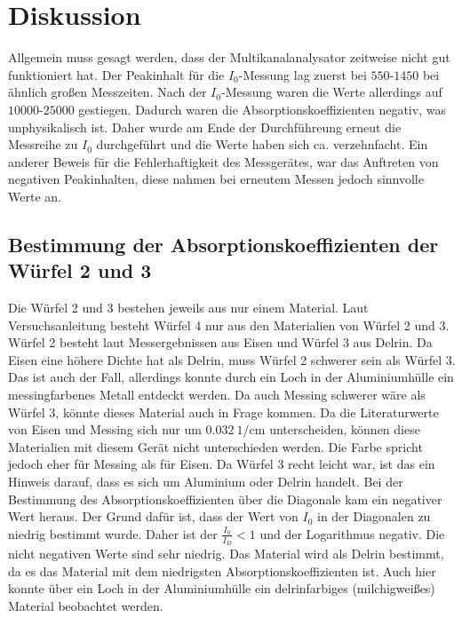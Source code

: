 \section{Diskussion}
\label{sec:Diskussion}

Allgemein muss gesagt werden, dass der Multikanalanalysator zeitweise nicht gut funktioniert hat. 
Der Peakinhalt für die $I_0$-Messung lag zuerst bei $\num{550}$-$\num{1450}$ bei ähnlich großen Messzeiten. Nach der $I_0$-Messung 
waren die Werte allerdings auf $\num{10000}$-$\num{25000}$ gestiegen. Dadurch waren die Absorptionskoeffizienten negativ, was unphysikalisch ist.
Daher wurde am Ende der Durchführeung erneut die Messreihe zu $I_0$ durchgeführt und die Werte haben sich ca. verzehnfacht. Ein anderer Beweis für 
die Fehlerhaftigkeit des Messgerätes, war das Auftreten von negativen Peakinhalten, diese nahmen bei erneutem Messen jedoch 
sinnvolle Werte an.

\subsection{Bestimmung der Absorptionskoeffizienten der Würfel 2 und 3}

Die Würfel 2 und 3 bestehen jeweils aus nur einem Material. Laut Versuchsanleitung besteht Würfel 4 nur aus den 
Materialien von Würfel 2 und 3. Würfel 2 besteht laut Messergebnissen aus Eisen und Würfel 3 aus Delrin. Da Eisen eine 
höhere Dichte hat als Delrin, muss Würfel 2 schwerer sein als Würfel 3. Das ist auch der Fall, allerdings konnte durch 
ein Loch in der Aluminiumhülle ein messingfarbenes Metall entdeckt werden. Da auch Messing schwerer wäre als Würfel 
3, könnte dieses Material auch in Frage kommen. Da die Literaturwerte von Eisen und Messing sich nur um $\SI{0.032}{1\per\centi\meter}$
unterscheiden, können diese Materialien mit diesem Gerät nicht unterschieden werden. Die Farbe spricht jedoch eher für Messing als für Eisen.
Da Würfel 3 recht leicht war, ist das ein Hinweis darauf, dass es sich um Aluminium oder Delrin handelt. 
Bei der Bestimmung des Absorptionskoeffizienten über die Diagonale kam ein negativer Wert heraus. Der Grund 
dafür ist, dass der Wert von $I_0$ in der Diagonalen zu niedrig bestimmt wurde. Daher ist der $\frac{I_0}{I_{D}}<1$ und 
der Logarithmus negativ. Die nicht negativen Werte sind sehr niedrig. Das Material wird als Delrin bestimmt, da es das Material
mit dem niedrigsten Absorptionskoeffizienten ist. Auch hier konnte über ein Loch in der Aluminiumhülle 
ein delrinfarbiges (milchigweißes) Material beobachtet werden.


